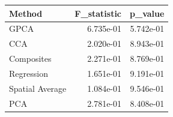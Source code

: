 \begin{tabular}{lrr}
\toprule
Method & F_statistic & p_value \\
\midrule
GPCA & 6.735e-01 & 5.742e-01 \\
CCA & 2.020e-01 & 8.943e-01 \\
Composites & 2.271e-01 & 8.769e-01 \\
Regression & 1.651e-01 & 9.191e-01 \\
Spatial Average & 1.084e-01 & 9.546e-01 \\
PCA & 2.781e-01 & 8.408e-01 \\
\bottomrule
\end{tabular}
